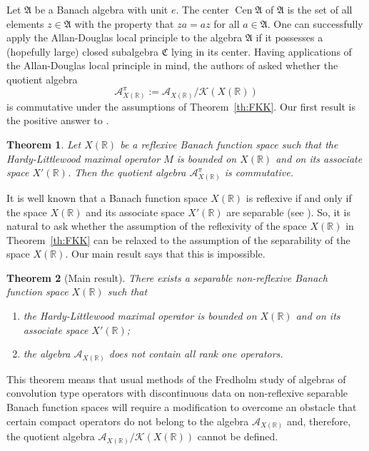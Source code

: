 \documentclass[reqno]{amsproc}
\newcommand{\cA}{\mathcal{A}}
\newcommand{\cK}{\mathcal{K}}
\newcommand{\R}{\mathbb{R}}
\newtheorem{theorem}{Theorem}[section]
\theoremstyle{definition}
\theoremstyle{remark}
\numberwithin{equation}{section}
\begin{document}
Let $\mathfrak{A}$ be a Banach algebra with unit $e$.  The center 
$\operatorname{Cen}\mathfrak{A}$ of $\mathfrak{A}$ is the set of all elements 
$z\in\mathfrak{A}$ with the property that $za = az$ for all $a\in\mathfrak{A}$.
One can successfully apply the Allan-Douglas local principle 
\cite[Section~1.35]{BS06} to the algebra $\mathfrak{A}$ if it possesses 
a (hopefully large) closed subalgebra $\mathfrak{C}$ lying in its center.
Having applications of the Allan-Douglas local principle in mind,
the authors of \cite{FKK19} asked whether the quotient algebra
\[
\cA_{X(\R)}^\pi:= \cA_{X(\R)}/\cK(X(\R))
\]
is commutative under the assumptions of Theorem~\ref{th:FKK}. Our first
result is the positive answer to \cite[Question~1.2]{FKK19}.
\begin{theorem}
\label{th:algebra-Api}
Let $X(\R)$ be a reflexive Banach function space such that the Hardy-Littlewood 
maximal operator $M$ is bounded on $X(\R)$ and on its associate space 
$X'(\R)$. Then the quotient algebra $\cA_{X(\R)}^\pi$ is commutative.
\end{theorem}
It is well known that a Banach function space $X(\R)$ is reflexive if and 
only if the space $X(\R)$ and its associate space $X'(\R)$ are separable 
(see \cite[Chap.~1, Corollaries 4.4 and 5.6]{BS88}). So, it is natural to 
ask whether the assumption of the reflexivity of the space $X(\R)$ in 
Theorem~\ref{th:FKK} can be relaxed to the assumption of the separability 
of the space $X(\R)$. Our main result says that this is impossible.
\begin{theorem}[Main result]
\label{th:main}
There exists a separable non-reflexive Banach function space $X(\R)$ such that
\begin{enumerate}
\item[(a)]
the Hardy-Littlewood maximal operator is bounded on $X(\R)$ and on 
its associate space $X'(\R)$;
\item[(b)]
the algebra $\cA_{X(\R)}$ does not contain all rank one operators.
\end{enumerate}
\end{theorem}
This theorem means that usual methods of the Fredholm study of algebras
of convolution type operators with discontinuous data on non-reflexive
separable Banach function spaces will require a modification to overcome
an obstacle that certain compact operators do not belong to the algebra
$\cA_{X(\R)}$ and, therefore, the quotient algebra $\cA_{X(\R)}/\cK(X(\R))$
cannot be defined. 
\end{document}
